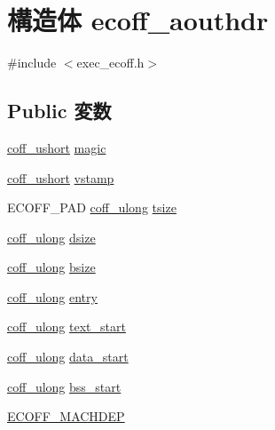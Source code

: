 \hypertarget{structecoff__aouthdr}{
\section{構造体 ecoff\_\-aouthdr}
\label{structecoff__aouthdr}
}


{\ttfamily \#include $<$exec\_\-ecoff.h$>$}\subsection*{Public 変数}
\begin{DoxyCompactItemize}
\item 
\hyperlink{ecoff__machdep_8h_a650e29ece54d87a3fb9db4505a0efb68}{coff\_\-ushort} \hyperlink{structecoff__aouthdr_aca6979aeb65157fc85c0d0d530c0297e}{magic}
\item 
\hyperlink{ecoff__machdep_8h_a650e29ece54d87a3fb9db4505a0efb68}{coff\_\-ushort} \hyperlink{structecoff__aouthdr_a6b0efcbed8ed80fdcf7b09271c64769e}{vstamp}
\item 
ECOFF\_\-PAD \hyperlink{ecoff__machdep_8h_a8465ac1e3c6711a52d3103550d8122fc}{coff\_\-ulong} \hyperlink{structecoff__aouthdr_a6be60df2acc8683822cfcf07fcdc18d7}{tsize}
\item 
\hyperlink{ecoff__machdep_8h_a8465ac1e3c6711a52d3103550d8122fc}{coff\_\-ulong} \hyperlink{structecoff__aouthdr_ad8f0d4f6c7863727ef4b3726219eb402}{dsize}
\item 
\hyperlink{ecoff__machdep_8h_a8465ac1e3c6711a52d3103550d8122fc}{coff\_\-ulong} \hyperlink{structecoff__aouthdr_aedec89f45640c336f07ff894bf83896e}{bsize}
\item 
\hyperlink{ecoff__machdep_8h_a8465ac1e3c6711a52d3103550d8122fc}{coff\_\-ulong} \hyperlink{structecoff__aouthdr_a671b26228224bf0a4bc8d95fde163e7c}{entry}
\item 
\hyperlink{ecoff__machdep_8h_a8465ac1e3c6711a52d3103550d8122fc}{coff\_\-ulong} \hyperlink{structecoff__aouthdr_a707429daa5ff7bc42212322fea009fe0}{text\_\-start}
\item 
\hyperlink{ecoff__machdep_8h_a8465ac1e3c6711a52d3103550d8122fc}{coff\_\-ulong} \hyperlink{structecoff__aouthdr_aca6e9d6a6c2e125ea5a008266486f5a2}{data\_\-start}
\item 
\hyperlink{ecoff__machdep_8h_a8465ac1e3c6711a52d3103550d8122fc}{coff\_\-ulong} \hyperlink{structecoff__aouthdr_abfb126c960de40f2d88c180fb1e6f67f}{bss\_\-start}
\item 
\hyperlink{structecoff__aouthdr_a24ee8a7fed1aa69a99b49589f5fc07a8}{ECOFF\_\-MACHDEP}
\end{DoxyCompactItemize}


